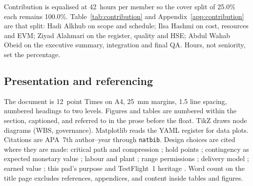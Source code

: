 Contribution is equalised at 42~hours per member so the cover split of 25.0\% each remains 100.0\%. Table~\ref{tab:contribution} and Appendix~\ref{app:contribution} are that split: Hadi Alkhub on scope and schedule; Ilsa Hashmi on cost, resources and EVM; Ziyad Alahmari on the register, quality and HSE; Abdul Wahab Obeid on the executive summary, integration and final QA. Hours, not seniority, set the percentage.

\subsection{Presentation and referencing}
\label{sec:integration-presentation}

The document is 12~point Times on A4, 25~mm margins, 1.5 line spacing, numbered headings to two levels. Figures and tables are numbered within the section, captioned, and referred to in the prose before the float. TikZ draws node diagrams (WBS, governance). Matplotlib reads the YAML register for data plots. Citations are APA~7th author--year through \texttt{natbib}. Design choices are cited where they are made: critical path and compression \citep{pmi2021,kerzner2017}; hold points \citep{sae2016}; contingency as expected monetary value \citep{kerzner2017,iso31000}; labour and plant \citep{fwc2026,rawlinsons2025}; range permissions \citep{casa2024,gbrmpa2019}; delivery model \citep{turner2014}; earned value \citep{pmi2019evm,fleming2016}; this pad's purpose and TestFlight~1 heritage \citep{gilmour2025,asa2025,dougherty2026,smith2025}. Word count on the title page excludes references, appendices, and content inside tables and figures.
